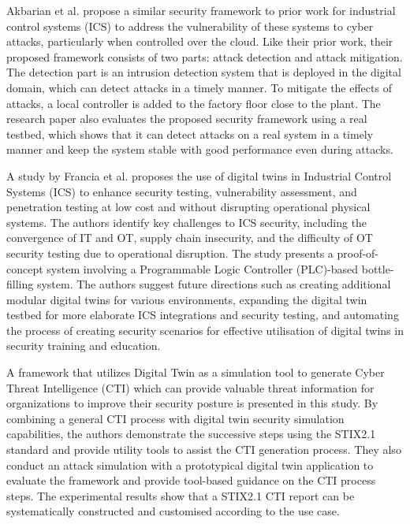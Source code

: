 Akbarian et al.\cite{akbarianSecurityFrameworkDigital2021} propose a similar security framework to prior work\cite{akbarianIntrusionDetectionDigital2020} for industrial control systems (ICS) to address the vulnerability of these systems to cyber attacks, particularly when controlled over the cloud. Like their prior work, their proposed framework consists of two parts: attack detection and attack mitigation. The detection part is an intrusion detection system that is deployed in the digital domain, which can detect attacks in a timely manner. To mitigate the effects of attacks, a local controller is added to the factory floor close to the plant. The research paper also evaluates the proposed security framework using a real testbed, which shows that it can detect attacks on a real system in a timely manner and keep the system stable with good performance even during attacks.

A study by Francia et al.\cite{franciaDigitalTwinsIndustrial2021} proposes the use of digital twins in Industrial Control Systems (ICS) to enhance security testing, vulnerability assessment, and penetration testing at low cost and without disrupting operational physical systems. The authors identify key challenges to ICS security, including the convergence of IT and OT, supply chain insecurity, and the difficulty of OT security testing due to operational disruption. The study presents a proof-of-concept system involving a Programmable Logic Controller (PLC)-based bottle-filling system. The authors suggest future directions such as creating additional modular digital twins for various environments, expanding the digital twin testbed for more elaborate ICS integrations and security testing, and automating the process of creating security scenarios for effective utilisation of digital twins in security training and education.

A framework that utilizes Digital Twin as a simulation tool to generate Cyber Threat Intelligence (CTI) which can provide valuable threat information for organizations to improve their security posture is presented in this study\cite{dietzHarnessingDigitalTwin2022}. By combining a general CTI process with digital twin security simulation capabilities, the authors demonstrate the successive steps using the STIX2.1 standard and provide utility tools to assist the CTI generation process. They also conduct an attack simulation with a prototypical digital twin application to evaluate the framework and provide tool-based guidance on the CTI process steps. The experimental results show that a STIX2.1 CTI report can be systematically constructed and customised according to the use case. 



